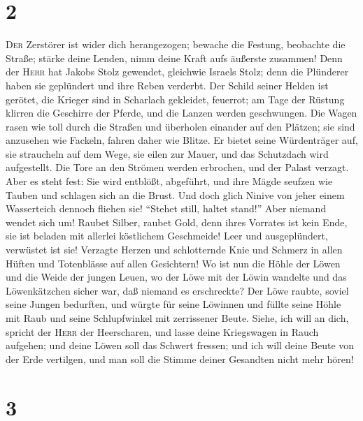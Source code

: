 \hypertarget{section-1}{%
\section{2}\label{section-1}}

 \textsc{Der} Zerstörer ist wider dich herangezogen;
bewache die Festung, beobachte die Straße; stärke deine Lenden, nimm
deine Kraft aufs äußerste zusammen!  Denn der
\textsc{Herr} hat Jakobs Stolz gewendet, gleichwie Israels Stolz; denn
die Plünderer haben sie geplündert und ihre Reben verderbt.
 Der Schild seiner Helden ist gerötet, die Krieger sind in
Scharlach gekleidet, feuerrot; am Tage der Rüstung klirren die Geschirre
der Pferde, und die Lanzen werden geschwungen.  Die Wagen
rasen wie toll durch die Straßen und überholen einander auf den Plätzen;
sie sind anzusehen wie Fackeln, fahren daher wie Blitze. 
Er bietet seine Würdenträger auf, sie straucheln auf dem Wege, sie eilen
zur Mauer, und das Schutzdach wird aufgestellt.  Die Tore
an den Strömen werden erbrochen, und der Palast verzagt. 
Aber es steht fest: Sie wird entblößt, abgeführt, und ihre Mägde seufzen
wie Tauben und schlagen sich an die Brust.  Und doch glich
Ninive von jeher einem Wasserteich dennoch fliehen sie! ``Stehet still,
haltet stand!''  Aber niemand wendet sich um! Raubet
Silber, raubet Gold, denn ihres Vorrates ist kein Ende, sie ist beladen
mit allerlei köstlichem Geschmeide!  Leer und
ausgeplündert, verwüstet ist sie! Verzagte Herzen und schlotternde Knie
und Schmerz in allen Hüften und Totenblässe auf allen Gesichtern!
 Wo ist nun die Höhle der Löwen und die Weide der jungen
Leuen, wo der Löwe mit der Löwin wandelte und das Löwenkätzchen sicher
war, daß niemand es erschreckte?  Der Löwe raubte, soviel
seine Jungen bedurften, und würgte für seine Löwinnen und füllte seine
Höhle mit Raub und seine Schlupfwinkel mit zerrissener Beute.
 Siehe, ich will an dich, spricht der \textsc{Herr} der
Heerscharen, und lasse deine Kriegswagen in Rauch aufgehen; und deine
Löwen soll das Schwert fressen; und ich will deine Beute von der Erde
vertilgen, und man soll die Stimme deiner Gesandten nicht mehr hören!

\hypertarget{section-2}{%
\section{3}\label{section-2}}

